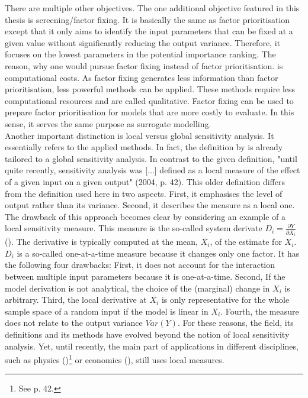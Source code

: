 There are multiple other objectives. The one additional objective featured in this thesis is screening/factor fixing. It is basically the same as factor prioritisation except that it only aims to identify the input parameters that can be fixed at a given value without significantly reducing the output variance. Therefore, it focuses on the lowest parameters in the potential importance ranking. The reason, why one would pursue factor fixing instead of factor prioritisation. is computational costs. As factor fixing generates less information than factor prioritisation, less powerful methods can be applied. These methods require less computational resources and are called qualitative. Factor fixing can be used to prepare factor prioritisation for models that are more costly to evaluate. In this sense, it serves the same purpose as surrogate modelling.\\

\noindent
Another important distinction is local versus global sensitivity analysis. It essentially refers to the applied methods. In fact, the definition by \cite{Saltelli.2004} is already tailored to a global sensitivity analysis. In contrast to the given definition, "until quite recently, sensitivity analysis was [...] defined as a local measure of the effect of a given input on a given output" \citeauthor{Saltelli.2004} (2004, p. 42). This older definition differs from the definition used here in two aspects. First, it emphasises the level of output rather than its variance. Second, it describes the measure as a local one. The drawback of this approach becomes clear by considering an example of a local sensitivity measure. This measure is the so-called system derivate $D_i = \frac{\partial Y}{\partial X_i}$ (\cite{rabitz1989systems}). The derivative is typically computed at the mean, $\overline{X_i}$, of the estimate for $X_i$. $D_i$ is a so-called one-at-a-time measure because it changes only one factor. It has the following four drawbacks: First, it does not account for the interaction between multiple input parameters because it is one-at-a-time. Second, If the model derivation is not analytical, the choice of the (marginal) change in $X_i$ is arbitrary. Third, the local derivative at $\overline{X_i}$ is only representative for the whole sample space of a random input if the model is linear in $X_i$. Fourth, the measure does not relate to the output variance $Var(Y)$. For these reasons, the field, its definitions and its methods have evolved beyond the notion of local sensitivity analysis. Yet, until recently, the main part of applications in different disciplines, such as physics (\cite{Saltelli.2004})\footnote{See p. 42.} or economics (\cite{Harenberg.2019}), still uses local measures.


